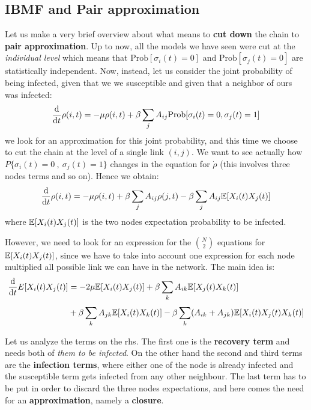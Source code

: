 \documentclass[../main/main.tex]{subfiles}
\begin{document}
\subsection{IBMF and Pair approximation}

Let us make a very brief overview about what means to \textbf{cut down} the chain to \textbf{pair approximation}.
Up to now, all the models we have seen were cut at the \textit{individual level} which means that \( \text{Prob} [\sigma _i (t)=0] \) and \( \text{Prob} [\sigma _j (t) = 0] \) are statistically independent. Now, instead, let us consider the joint probability of being infected, given that we we susceptible and given that a neighbor of ours was infected:
\begin{equation*}
  \dv{}{t} \rho (i,t) = - \mu \rho (i,t) + \beta \sum_{j}^{} A_{ij} \text{Prob} [\sigma _i(t)=0, \sigma _j(t)=1]
\end{equation*}
we look for an approximation for this joint probability, and this time we choose to cut the chain at the level of a single link $(i,j)$.
We want to see actually how $P\{\sigma_i(t) = 0\ ,\   \sigma_j (t) = 1\}$ changes in the equation for $\dot{\rho}$ (this involves three nodes terms and so on).
Hence we obtain:
\begin{equation*}
  \dv{}{t} \rho (i,t) = - \mu \rho (i,t) + \beta \sum_{j}^{} A_{ij} \rho (j,t) - \beta \sum_{j}^{} A_{ij} \mathbb{E} \qty[X_i (t) X_j (t)]
\end{equation*}
where \(  \mathbb{E} \qty[X_i (t) X_j (t)] \) is the two nodes expectation probability to be infected.

However, we need to look for an expression for the $\binom{N}{2}$ equations for \(  \mathbb{E}  \qty[X_i (t) X_j (t)] \), since we have to take into account one expression for each node multiplied all possible link we can have in the network.
The main idea is:
\begin{equation}
\begin{split}
  \dv{}{t} E \qty[X_i (t) X_j (t)] &=  - 2 \mu \mathbb{E} \qty[X_i (t) X_j (t)] + \beta \sum_{k}^{} A_{ik} \mathbb{E} \qty[X_j (t) X_k (t)]  \\
  & + \beta \sum_{k}^{} A_{jk} \mathbb{E} \qty[X_i (t) X_k (t)]  - \beta
  \sum_{k}^{} (A_{ik}+A_{jk}) \mathbb{E} \qty[X_i (t) X_j (t) X_k (t)]
\end{split}
\end{equation}

Let us analyze the terms on the rhs. The first one is the \textbf{recovery term} and needs both of \textit{them to be infected}. On the other hand the second and third terms are the \textbf{infection terms}, where either one of the node is already infected and the susceptible term gets infected from any other neighbour. The last term has to be put in order to discard the three nodes expectations, and here comes the need for an \textbf{approximation}, namely a \textbf{closure}.
\end{document}

